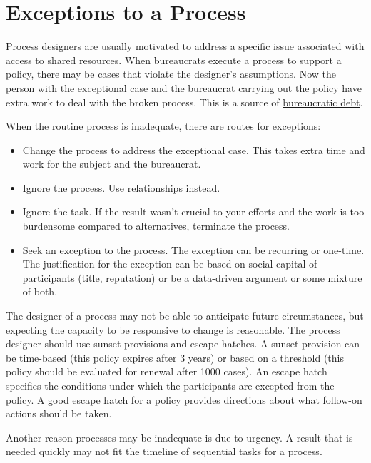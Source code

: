 \section{Exceptions to a Process\label{sec:exceptions-to-process}}


Process designers are usually motivated to address a specific issue associated with access to shared resources. When bureaucrats execute a process to support a policy, there may be cases that violate the designer's assumptions. Now the person with the exceptional case and the bureaucrat carrying out the policy have extra work to deal with the broken process. This is a source of \hyperref[sec:bureaucratic-debt]{bureaucratic debt}. 

When the routine process is inadequate, there are routes for exceptions:
\begin{itemize}
    \item Change the process to address the exceptional case. This takes extra time and work for the subject and the bureaucrat.
    \item Ignore the process. Use relationships instead.
    \item Ignore the task. If the result wasn't crucial to your efforts and the work is too burdensome compared to alternatives, terminate the process.
    \item Seek an exception to the process. The exception can be recurring or one-time. The justification for the exception can be based on social capital of participants (title, reputation) or be a data-driven argument or some mixture of both.
\end{itemize}

The designer of a process may not be able to anticipate future circumstances, but expecting the capacity to be responsive to change is reasonable. The process designer should use sunset provisions and escape hatches.  
A sunset provision can be time-based (this policy expires after 3 years) or based on a threshold (this policy should be evaluated for renewal after 1000 cases). An escape hatch specifies the conditions under which the participants are excepted from the policy. A good escape hatch for a policy provides directions about what follow-on actions should be taken.

Another reason processes may be inadequate is due to urgency. A result that is needed quickly may not fit the timeline of sequential tasks for a process.

